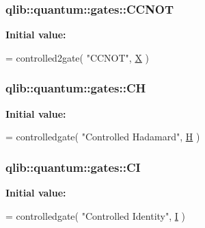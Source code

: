\subsubsection[{\texorpdfstring{C\+C\+N\+OT}{CCNOT}}]{ qlib\+::quantum\+::gates\+::\+C\+C\+N\+OT}\hypertarget{namespaceqlib_1_1quantum_1_1gates_abe265e0dfc0f6dce748643ad93dc6e01}{}\label{namespaceqlib_1_1quantum_1_1gates_abe265e0dfc0f6dce748643ad93dc6e01}
{\bfseries Initial value\+:}
\begin{DoxyCode}
= controlled2gate(
    \textcolor{stringliteral}{"CCNOT"}, 
    \hyperlink{namespaceqlib_1_1quantum_1_1gates_af56c4617497a46f091c27f7f4bc65ed5}{X}
    )
\end{DoxyCode}
\subsubsection[{\texorpdfstring{CH}{CH}}]{ qlib\+::quantum\+::gates\+::\+CH}\hypertarget{namespaceqlib_1_1quantum_1_1gates_a94cfb96baacb02ad566b02c978a6b279}{}\label{namespaceqlib_1_1quantum_1_1gates_a94cfb96baacb02ad566b02c978a6b279}
{\bfseries Initial value\+:}
\begin{DoxyCode}
= controlledgate(
    \textcolor{stringliteral}{"Controlled Hadamard"},
    \hyperlink{namespaceqlib_1_1quantum_1_1gates_a2519bc26f39ef5297d03a5fe7cdf3bc3}{H}
)
\end{DoxyCode}
\subsubsection[{\texorpdfstring{CI}{CI}}]{ qlib\+::quantum\+::gates\+::\+CI}\hypertarget{namespaceqlib_1_1quantum_1_1gates_a7876e701afb94e13974915d144b09203}{}\label{namespaceqlib_1_1quantum_1_1gates_a7876e701afb94e13974915d144b09203}
{\bfseries Initial value\+:}
\begin{DoxyCode}
= controlledgate(
    \textcolor{stringliteral}{"Controlled Identity"},
    \hyperlink{namespaceqlib_1_1quantum_1_1gates_a2a7dd0215add2c303251bb3a3ac596cc}{I}
)
\end{DoxyCode}

